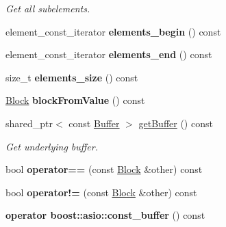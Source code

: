 \begin{DoxyCompactItemize}
\begin{DoxyCompactList}\small\item\em Get all subelements. \end{DoxyCompactList}\item 
element\+\_\+const\+\_\+iterator {\bfseries elements\+\_\+begin} () const\hypertarget{classndn_1_1Block_a2beab657d9922795a0391fc5099b8cb2}{}\label{classndn_1_1Block_a2beab657d9922795a0391fc5099b8cb2}

\item 
element\+\_\+const\+\_\+iterator {\bfseries elements\+\_\+end} () const\hypertarget{classndn_1_1Block_a48601275647ba09143d76b3008ef0957}{}\label{classndn_1_1Block_a48601275647ba09143d76b3008ef0957}

\item 
size\+\_\+t {\bfseries elements\+\_\+size} () const\hypertarget{classndn_1_1Block_a0522f46bc75719a7ea1775e127b47efa}{}\label{classndn_1_1Block_a0522f46bc75719a7ea1775e127b47efa}

\item 
\hyperlink{classndn_1_1Block}{Block} {\bfseries block\+From\+Value} () const\hypertarget{classndn_1_1Block_a34cfc9ac7c41ea4636889cf497a47aa3}{}\label{classndn_1_1Block_a34cfc9ac7c41ea4636889cf497a47aa3}

\item 
shared\+\_\+ptr$<$ const \hyperlink{classndn_1_1Buffer}{Buffer} $>$ \hyperlink{classndn_1_1Block_a37add7fbb26925ace2dee112b72402ed}{get\+Buffer} () const\hypertarget{classndn_1_1Block_a37add7fbb26925ace2dee112b72402ed}{}\label{classndn_1_1Block_a37add7fbb26925ace2dee112b72402ed}

\begin{DoxyCompactList}\small\item\em Get underlying buffer. \end{DoxyCompactList}\item 
bool {\bfseries operator==} (const \hyperlink{classndn_1_1Block}{Block} \&other) const\hypertarget{classndn_1_1Block_a6efca3ad00df5c534dda5083340262c6}{}\label{classndn_1_1Block_a6efca3ad00df5c534dda5083340262c6}

\item 
bool {\bfseries operator!=} (const \hyperlink{classndn_1_1Block}{Block} \&other) const\hypertarget{classndn_1_1Block_a38aae95e11a16f6f63aaf58f09a78769}{}\label{classndn_1_1Block_a38aae95e11a16f6f63aaf58f09a78769}

\item 
{\bfseries operator boost\+::asio\+::const\+\_\+buffer} () const\hypertarget{classndn_1_1Block_a8ad59b02d3103ce9fbc0b6a8d0de2c2e}{}\label{classndn_1_1Block_a8ad59b02d3103ce9fbc0b6a8d0de2c2e}

\end{DoxyCompactItemize}

